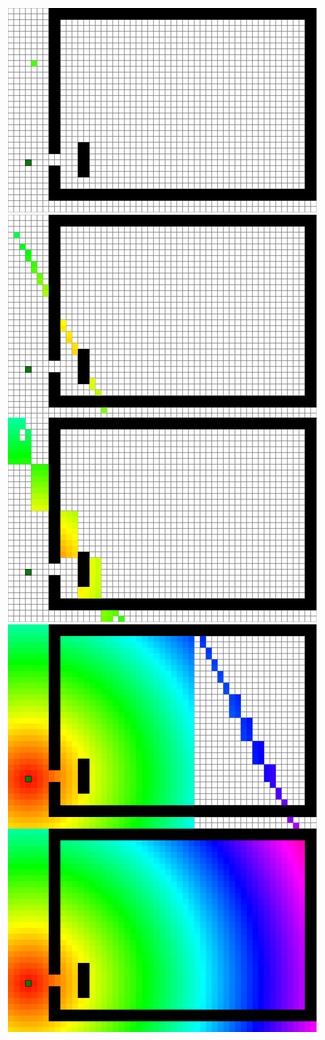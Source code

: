 \begin{figure}
\centering
\begin{minipage}{0.32\textwidth}
\centering
  \includegraphics[width=\linewidth]{abbildungen/vergleich_euklid_fast_marching/snapshot_eEuclid_zusammen_cutted.png}

\end{minipage}
\end{figure}
